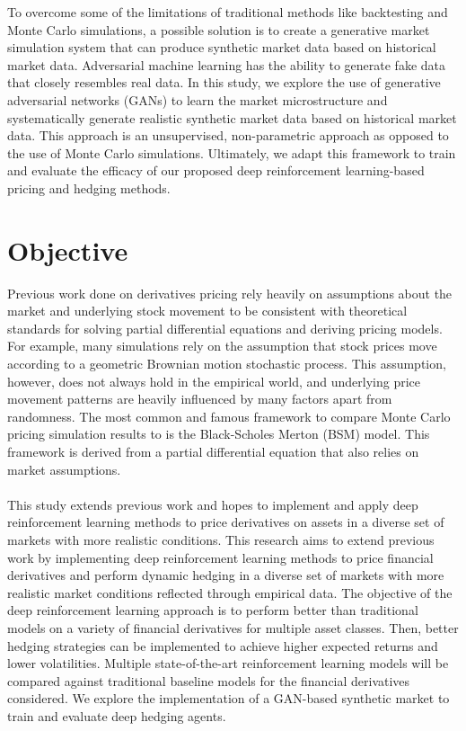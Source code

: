 To overcome some of the limitations of traditional methods like backtesting and Monte Carlo simulations, a possible solution is to create a generative market simulation system that can produce synthetic market data based on historical market data. Adversarial machine learning has the ability to generate fake data that closely resembles real data. In this study, we explore the use of generative adversarial networks (GANs) to learn the market microstructure and systematically generate realistic synthetic market data based on historical market data. This approach is an unsupervised, non-parametric approach as opposed to the use of Monte Carlo simulations. Ultimately, we adapt this framework to train and evaluate the efficacy of our proposed deep reinforcement learning-based pricing and hedging methods.

\section{Objective}

Previous work done on derivatives pricing rely heavily on assumptions about the market and underlying stock movement to be consistent with theoretical standards for solving partial differential equations and deriving pricing models. For example, many simulations rely on the assumption that stock prices move according to a geometric Brownian motion stochastic process. This assumption, however, does not always hold in the empirical world, and underlying price movement patterns are heavily influenced by many factors apart from randomness. The most common and famous framework to compare Monte Carlo pricing simulation results to is the Black-Scholes Merton (BSM) model. This framework is derived from a partial differential equation that also relies on market assumptions.
\\
\\
This study extends previous work and hopes to implement and apply deep reinforcement learning methods to price derivatives on assets in a diverse set of markets with more realistic conditions. This research aims to extend previous work by implementing deep reinforcement learning methods to price financial derivatives and perform dynamic hedging in a diverse set of markets with more realistic market conditions reflected through empirical data. The objective of the deep reinforcement learning approach is to perform better than traditional models on a variety of financial derivatives for multiple asset classes. Then, better hedging strategies can be implemented to achieve higher expected returns and lower volatilities. Multiple state-of-the-art reinforcement learning models will be compared against traditional baseline models for the financial derivatives considered. We explore the implementation of a GAN-based synthetic market to train and evaluate deep hedging agents.

